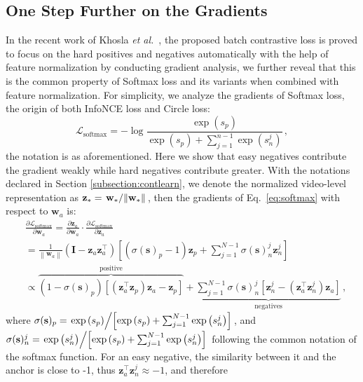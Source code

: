 \documentclass[10pt,twocolumn,letterpaper]{article}
\begin{document}
\subsection{One Step Further on the Gradients} \label{subsection:onestepfurther}
In the recent work of Khosla \textit{et al.}~\cite{Khosla2020SupervisedCL}, the proposed batch contrastive loss is proved to focus on the hard positives and negatives automatically with the help of feature normalization by conducting gradient analysis, we further reveal that this is the common property of Softmax loss and its variants when combined with feature normalization. For simplicity, we analyze the gradients of Softmax loss, the origin of both InfoNCE loss and Circle loss:
{\small
\begin{equation} \label{eq:softmax}
    \mathcal{L}_{\text{softmax}}= -\log\frac{\exp\left(s_p\right)}{\exp\left(s_p\right)+\sum_{j=1}^{n-1}\exp\left(s_{n}^{j}\right)} \,,
\end{equation}
}
the notation is as aforementioned. Here we show that easy negatives contribute the gradient weakly while hard negatives contribute greater. With the notations declared in Section \ref{subsection:contlearn}, we denote the normalized video-level representation as $\mathbf{z}_{*} = \left. \mathbf{w}_{*} \middle/ \left\|\mathbf{w}_{*}\right\| \right.$, then the gradients of Eq.~\ref{eq:softmax} with respect to $\mathbf{w}_{a}$ is:
{\small
\begin{equation} \label{eq:softmaxw}
\begin{aligned}
    &\frac{\partial\mathcal{L}_{\text{softmax}}}{\partial \mathbf{w}_{a}}
    = \frac{\partial \mathbf{z}_{a}}{\partial \mathbf{w}_{a}} \cdot \frac{\partial \mathcal{L}_{\text{softmax}}}{\partial \mathbf{z}_{a}} \\
    &= \frac{1}{\left\| \mathbf{w}_{a} \right\|} \left( \mathbf{I} - \mathbf{z}_{a}\mathbf{z}_{a}^{\top} \right) \left[ \left( \sigma(\mathbf{s})_{p} - 1 \right)\mathbf{z}_{p} + \sum_{j=1}^{N-1}\sigma(\mathbf{s})_{n}^{j}\mathbf{z}_{n}^{j} \right] \\
    &\propto  
    \overbrace{( 1 - \sigma(\mathbf{s})_{p} )[ (\mathbf{z}_{a}^{\top}\mathbf{z}_{p})\mathbf{z}_{a} - \mathbf{z}_{p} ]}^{\text{positive}}
    +
    \underbrace{\sum_{j=1}^{N-1}\sigma(\mathbf{s})_{n}^{j}[ \mathbf{z}_{n}^{j} - (\mathbf{z}_{a}^{\top}\mathbf{z}_{n}^{j})\mathbf{z}_{a} ]}_{\text{negatives}} \,,
\end{aligned}
\end{equation}
}
where $\sigma(\mathbf{s})_{p} = \left. \exp\left(s_{p}\right) \middle/ \left[ \exp\left(s_{p}\right) + \sum_{j=1}^{N-1} \exp\left(s_{n}^{j}\right) \right] \right.$, and $\sigma(\mathbf{s})_{n}^{j} = \left. \exp\left(s_{n}^{j}\right) \middle/ \left[ \exp\left(s_{p}\right) + \sum_{j=1}^{N-1} \exp\left(s_{n}^{j}\right) \right] \right.$ following the common notation of the softmax function. For an easy negative, the similarity between it and the anchor is close to -1, thus $\mathbf{z}_{a}^{\top}\mathbf{z}_{n}^{j} \approx -1$, and therefore
\end{document}

